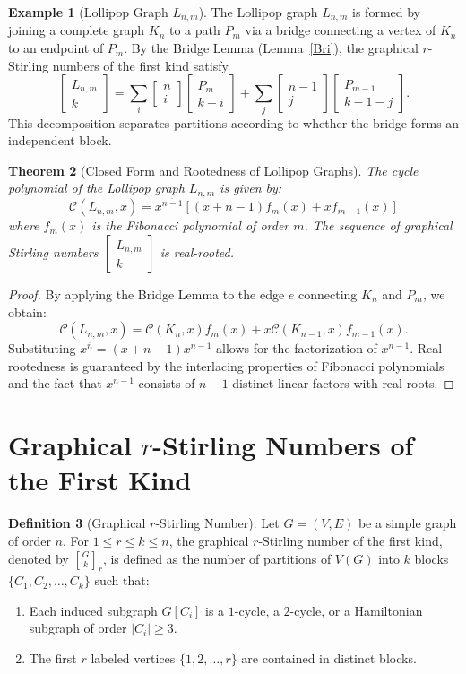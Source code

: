 \documentclass{amsart}
\newtheorem{theorem}{Theorem}[section]
\theoremstyle{definition}
\newtheorem{definition}[theorem]{Definition}
\newtheorem{example}[theorem]{Example}
\def\st#1#2{\begin{bmatrix} #1 \\ #2 \end{bmatrix}}
\begin{document}
\begin{example}[Lollipop Graph $L_{n,m}$]
The Lollipop graph $L_{n,m}$ is formed by joining a complete graph $K_n$ to a path $P_m$ via a bridge connecting a vertex of $K_n$ to an endpoint of $P_m$. By the Bridge Lemma (Lemma~\ref{Bri}), the graphical $r$-Stirling numbers of the first kind satisfy
\begin{equation*}
    \st{L_{n,m}}{k} = \sum_i \st{n}{i} \st{P_m}{k-i} + \sum_j \st{n-1}{j} \st{P_{m-1}}{k-1-j}.
\end{equation*}
This decomposition separates partitions according to whether the bridge forms an independent block.
\end{example}

\begin{theorem}[Closed Form and Rootedness of Lollipop Graphs]
The cycle polynomial of the Lollipop graph $L_{n,m}$ is given by:
\begin{equation*}
    \mathcal{C}(L_{n,m}, x) = x^{\overline{n-1}} \left[ (x + n - 1) f_m(x) + x f_{m-1}(x) \right]
\end{equation*}
where $f_m(x)$ is the Fibonacci polynomial of order $m$. The sequence of graphical Stirling numbers $\st{L_{n,m}}{k}$ is real-rooted.
\end{theorem}

\begin{proof}
By applying the Bridge Lemma to the edge $e$ connecting $K_n$ and $P_m$, we obtain:
\begin{equation*}
    \mathcal{C}(L_{n,m}, x) = \mathcal{C}(K_n, x)f_m(x) + x\mathcal{C}(K_{n-1}, x)f_{m-1}(x).
\end{equation*}
Substituting $x^{\overline{n}} = (x+n-1)x^{\overline{n-1}}$ allows for the factorization of $x^{\overline{n-1}}$. Real-rootedness is guaranteed by the interlacing properties of Fibonacci polynomials and the fact that $x^{\overline{n-1}}$ consists of $n-1$ distinct linear factors with real roots.
\end{proof}
\section{Graphical $r$-Stirling Numbers of the First Kind}
\begin{definition}[Graphical $r$-Stirling Number]
Let $G=(V,E)$ be a simple graph of order $n$. For $1 \leq r \leq k \leq n$, the graphical $r$-Stirling number of the first kind, denoted by ${G \brack k}_r$, is defined as the number of partitions of $V(G)$ into $k$ blocks $\{C_1, C_2, \dots, C_k\}$ such that:
\begin{enumerate}
    \item Each induced subgraph $G[C_i]$ is a $1$-cycle, a $2$-cycle, or a Hamiltonian subgraph of order $|C_i| \geq 3$.
    \item The first $r$ labeled vertices $\{1, 2, \dots, r\}$ are contained in distinct blocks.
\end{enumerate}
\end{definition}
\end{document}
